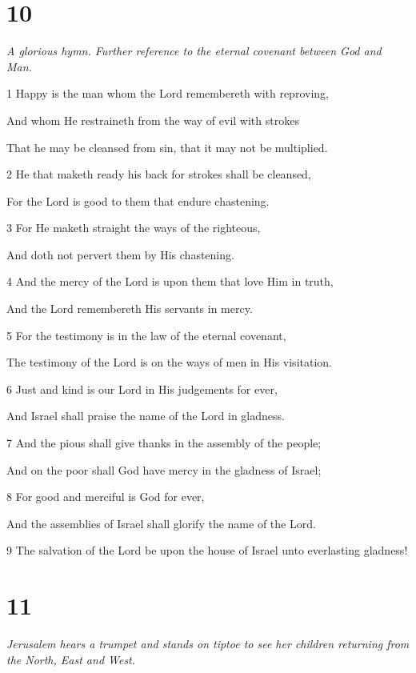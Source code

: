 \chapter{10}

\par \textit{A glorious hymn. Further reference to the eternal covenant between God and Man.}

\par 1 Happy is the man whom the Lord remembereth with reproving,
\par  And whom He restraineth from the way of evil with strokes
\par  That he may be cleansed from sin, that it may not be multiplied.
\par 2 He that maketh ready his back for strokes shall be cleansed,
\par  For the Lord is good to them that endure chastening.
\par 3 For He maketh straight the ways of the righteous,
\par  And doth not pervert them by His chastening.
\par 4 And the mercy of the Lord is upon them that love Him in truth,
\par  And the Lord remembereth His servants in mercy.
\par 5 For the testimony is in the law of the eternal covenant,
\par  The testimony of the Lord is on the ways of men in His visitation.
\par 6 Just and kind is our Lord in His judgements for ever,
\par  And Israel shall praise the name of the Lord in gladness.
\par 7 And the pious shall give thanks in the assembly of the people;
\par  And on the poor shall God have mercy in the gladness of Israel;
\par 8 For good and merciful is God for ever,
\par  And the assemblies of Israel shall glorify the name of the Lord.
\par    
\par 9 The salvation of the Lord be upon the house of Israel unto everlasting gladness!

\chapter{11}

\par \textit{Jerusalem hears a trumpet and stands on tiptoe to see her children returning from the North, East and West.}


